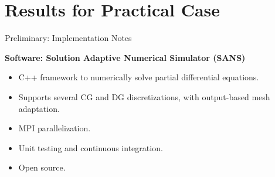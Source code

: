 \documentclass{beamer}
\newcounter{sectionframes}
\newcommand{\setsectionframes}[1]{%
  \setcounter{sectionframes}{#1}%
}
\newcounter{sectionframecount}
\begin{document}
\begin{frame}[plain, t]

\end{frame}

\section{Results for Practical Case}

\setsectionframes{9}


\begin{frame}[t]{Preliminary: Implementation Notes}

\textbf{Software: Solution Adaptive Numerical Simulator (SANS)\footnotemark}
\begin{itemize}
  \item C++ framework to numerically solve partial differential equations.
  \item Supports several CG and DG discretizations, with output-based mesh adaptation.
  \item MPI parallelization.
  \item Unit testing and continuous integration.
  \item Open source.
\end{itemize}


\end{frame}
\end{document}
